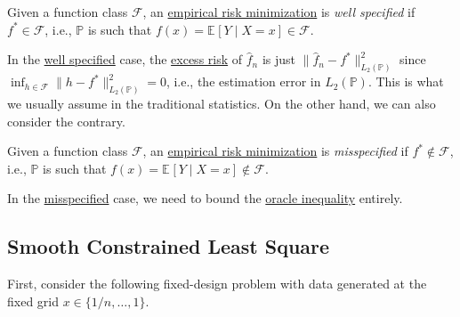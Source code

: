 \begin{definition}\label{def:well-specified}
	Given a function class \(\mathscr{F} \), an \hyperref[prb:ERM]{empirical risk minimization} is \emph{well specified} if \(f^{\ast} \in \mathscr{F} \), i.e., \(\mathbb{P} \) is such that \(f(x) = \mathbb{E}_{}\left[Y \mid X = x \right] \in \mathscr{F} \).
\end{definition}

In the \hyperref[def:well-specified]{well specified} case, the \hyperref[def:excess-risk]{excess risk} of \(\hat{f} _n \) is just \(\lVert \hat{f} _n - f^{\ast} \rVert _{L_2(\mathbb{P} )}^2 \) since \(\inf _{h\in \mathscr{F} } \lVert h - f^{\ast} \rVert ^2 _{L_2(\mathbb{P} )} = 0\), i.e., the estimation error in \(L_2(\mathbb{P} )\). This is what we usually assume in the traditional statistics. On the other hand, we can also consider the contrary.

\begin{definition}[Misspecified]\label{def:misspecified}
	Given a function class \(\mathscr{F} \), an \hyperref[prb:ERM]{empirical risk minimization} is \emph{misspecified} if \(f^{\ast} \notin \mathscr{F} \), i.e., \(\mathbb{P} \) is such that \(f(x) = \mathbb{E}_{}\left[Y \mid X = x \right] \notin \mathscr{F} \).
\end{definition}

In the \hyperref[def:misspecified]{misspecified} case, we need to bound the \hyperref[eq:oracle-inequality]{oracle inequality} entirely.

\subsection{Smooth Constrained Least Square}
First, consider the following fixed-design problem with data generated at the fixed grid \(x\in \{ 1 / n, \dots , 1 \} \).


